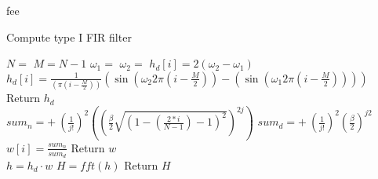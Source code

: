 fee
\begin{algorithm}
\caption{Compute type I FIR filter}
\label{array-sum}
\begin{algorithmic}[1] 
\State $N = $  
\State $M = N-1$ 
\State $\omega_1 = $ 
\State $\omega_2 = $ 
        		\State $h_d[i] = 2(\omega_2 - \omega_1)$
        	\Else 
        		\State  $h_d[i] = \frac{1}{ (\pi (i - \frac{M}{2}))}(\sin(\omega_2 2 \pi (i - \frac{M}{2})) - (\sin(\omega_1 2 \pi (i - \frac{M}{2}))))$ 
        	\EndIf 
	\EndFor
	\State Return $h_d$
\EndProcedure
\\
			\State $ sum_n = + \ (\frac{1}{j!})^2 \left( \left( \frac{\beta}{2} \sqrt{\left(1 - \left( \frac{2*i}{N-1}\right) - 1\right)^2}\right)^{2j}\right)$
			\State $ sum_d = + \ (\frac{1}{j!})^2 \left( \frac{\beta}{2}\right)^{j2}$
		\EndFor
		\State $w[i]=\frac{sum_n}{sum_d}$
	\EndFor
	\State Return $w$
\EndProcedure 
\\
	\State $h = h_d \cdot w$ 
	\State $H = fft(h)$ 
	\State Return $H$
\EndProcedure

\end{algorithmic}
\end{algorithm}